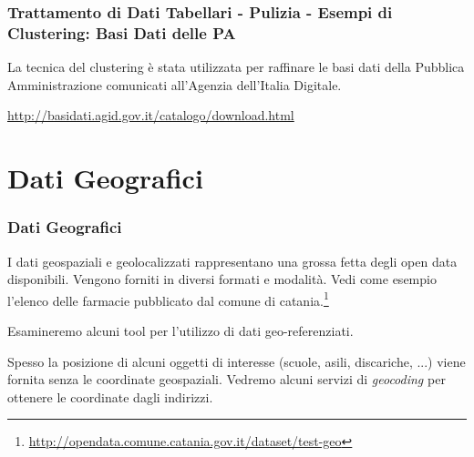 \documentclass[8pt]{beamer}
\begin{document}
\begin{frame}
 \frametitle{Trattamento di Dati Tabellari - Pulizia - Esempi di Clustering: Basi Dati delle PA}

 La tecnica del clustering \`e stata utilizzata per raffinare
 le basi dati della Pubblica Amministrazione comunicati all'Agenzia 
 dell'Italia Digitale.
  \begin{center}
    \begin{small}
      \url{http://basidati.agid.gov.it/catalogo/download.html} 
    \end{small} 
  \end{center}



\end{frame}

\section{Dati Geografici}

\begin{frame}
 \frametitle{Dati Geografici}
 
 I dati geospaziali e geolocalizzati rappresentano una grossa fetta degli open data disponibili.
 Vengono forniti in diversi formati e modalit\`a. Vedi come esempio l'elenco delle farmacie
 pubblicato dal comune di catania.\footnote{\url{http://opendata.comune.catania.gov.it/dataset/test-geo}}
 \vspace{\baselineskip}
 
 Esamineremo alcuni tool per l'utilizzo di dati geo-referenziati.
 \vspace{\baselineskip}
 
 Spesso la posizione di alcuni oggetti di interesse (scuole, asili, discariche, ...) viene fornita
 senza le coordinate geospaziali. Vedremo alcuni servizi di \emph{geocoding} per ottenere le coordinate
 dagli indirizzi.
\end{frame}
\end{document}

